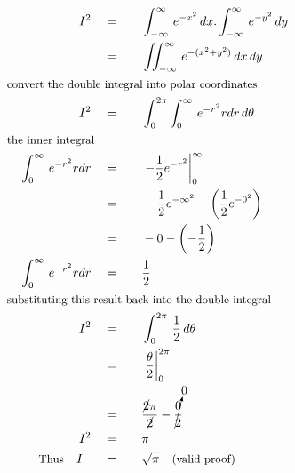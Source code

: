 \begin{alignat*}{5}
&\,&I^2\quad&=\quad&&\int_{-\infty}^\infty\,e^{-x^2}\,dx.\int_{-\infty}^\infty\,e^{-y^2}\,dy\\
&\,&\,&=&&\iint_{-\infty}^\infty\,e^{-(x^2+y^2)}\,dx\,dy\\
&\rlap{\small\text{convert the double integral into polar coordinates}}\\
&\,&I^2\quad&=&&\int_0^{2\pi}\int_0^\infty\,e^{-r^2}rdr\,d\theta\\
&\rlap{\small\text{the inner integral}}\\
&\,&\int_0^\infty\,e^{-r^2}rdr\quad&=&&\left.-\frac{1}{2}e^{-r^2}\right\vert_0^\infty\\
&\,&\,&=&&-\frac{1}{2}e^{-\infty^2}-\left(\frac{1}{2}e^{-0^2}\right)\\
&\,&\,&=&&-0-\left(-\frac{1}{2}\right)\\
&\,&\int_0^\infty\,e^{-r^2}rdr\quad&=&&\frac{1}{2}\\
&\rlap{\small\text{substituting this result back into the double integral}}\\
&\,&I^2\quad&=&&\int_0^{2\pi}\,\frac{1}{2}\,d\theta\\
&\,&\,&=&&\left.\frac{\theta}{2}\right\vert_0^{2\pi}\\
&\,&\,&=&&\frac{\cancel{2}\pi}{\cancel{2}}-\cancelto{0}{\frac{0}{2}}\\
&\,&I^2\quad&=&&\pi\\
&\,&\small\text{Thus}\normalsize\quad I~~\quad&=&&\sqrt{\pi}\quad\small\text{(valid proof)}
\end{alignat*}
